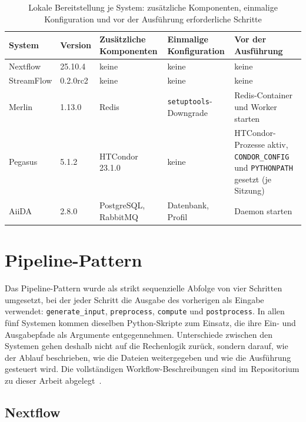 \begin{table}[ht]
  \caption{Lokale Bereitstellung je System: zusätzliche Komponenten, einmalige Konfiguration und vor der Ausführung erforderliche Schritte}
  \label{tab:lokal:dienste}
  \centering
  \footnotesize
  \renewcommand{\arraystretch}{1.3}
  \begin{tabular}{l l p{2.6cm} p{3.0cm} p{3.4cm}}
    \hline
    \textbf{System} & \textbf{Version} & \textbf{Zusätzliche Komponenten} & \textbf{Einmalige Konfiguration} & \textbf{Vor der Ausführung} \\
    \hline
    Nextflow   & 25.10.4  & keine & keine & keine \\
    StreamFlow & 0.2.0rc2 & keine & keine & keine \\
    Merlin     & 1.13.0   & Redis & \texttt{setuptools}-Downgrade & Redis-Container und Worker starten \\
    Pegasus    & 5.1.2    & HTCondor 23.1.0 & keine & HTCondor-Prozesse aktiv, \texttt{CONDOR\_CONFIG} und \texttt{PYTHONPATH} gesetzt (je Sitzung) \\
    AiiDA      & 2.8.0    & PostgreSQL, RabbitMQ & Datenbank, Profil & Daemon starten \\
    \hline
  \end{tabular}
\end{table}

\section{Pipeline-Pattern}
\label{sec:lokal:pipeline}

Das Pipeline-Pattern wurde als strikt sequenzielle Abfolge von vier
Schritten umgesetzt, bei der jeder Schritt die Ausgabe des vorherigen
als Eingabe verwendet: \texttt{generate\_input}, \texttt{preprocess},
\texttt{compute} und \texttt{postprocess}. In allen fünf Systemen
kommen dieselben Python-Skripte zum Einsatz, die ihre Ein- und
Ausgabepfade als Argumente entgegennehmen. Unterschiede zwischen den
Systemen gehen deshalb nicht auf die Rechenlogik zurück, sondern
darauf, wie der Ablauf beschrieben, wie die Dateien weitergegeben und
wie die Ausführung gesteuert wird. Die vollständigen Workflow-Beschreibungen sind im Repositorium zu dieser Arbeit abgelegt~\cite{barepo}.

\subsection{Nextflow}
\label{sec:lokal:pipeline:nextflow}

